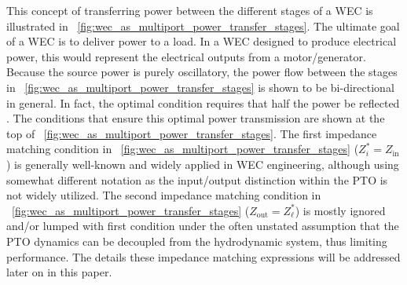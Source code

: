 \documentclass[lettersize,journal]{IEEEtran}
\begin{document}
This concept of transferring power between the different stages of a WEC is illustrated in \figurename~\ref{fig:wec_as_multiport_power_transfer_stages}.
The ultimate goal of a WEC is to deliver power to a load.
In a WEC designed to produce electrical power, this would represent the electrical outputs from a motor/generator.
Because the source power is purely oscillatory, the power flow between the stages in \figurename~\ref{fig:wec_as_multiport_power_transfer_stages} is shown to be bi-directional in general.
In fact, the optimal condition requires that half the power be reflected \cite{Evans1976}.
The conditions that ensure this optimal power transmission are shown at the top of \figurename~\ref{fig:wec_as_multiport_power_transfer_stages}.
The first impedance matching condition in \figurename~\ref{fig:wec_as_multiport_power_transfer_stages} ($Z_i^* = Z_{\textrm{in}}$) is generally well-known and widely applied in WEC engineering, although using somewhat different notation as the input/output distinction within the PTO is not widely utilized.
The second impedance matching condition in \figurename~\ref{fig:wec_as_multiport_power_transfer_stages} ($Z_{\textrm{out}} = Z_\ell^*$) is mostly ignored and/or lumped with first condition under the often unstated assumption that the PTO dynamics can be decoupled from the hydrodynamic system, thus limiting performance.
The details these impedance matching expressions will be addressed later on in this paper.
\end{document}
